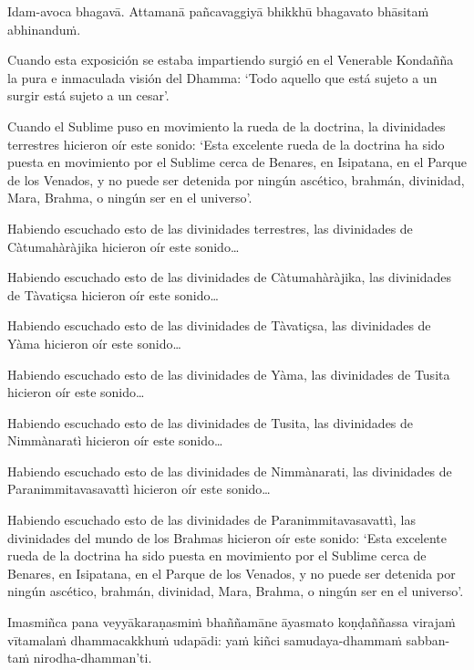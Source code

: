 Idam-avoca bhagavā. Attamanā pañcavaggiyā bhikkhū bhagavato bhāsitaṁ
abhinanduṁ.

\clearpage

\englishText
\markboth{\englishTitle}{\rightmark}

Cuando esta exposición se estaba impartiendo surgió en el Venerable Kondañña la pura e inmaculada visión del Dhamma: ‘Todo aquello que está sujeto a un surgir está sujeto a un cesar’.

Cuando el Sublime puso en movimiento la rueda de la doctrina, la divinidades terrestres hicieron oír este sonido: ‘Esta excelente rueda de la doctrina ha sido puesta en movimiento por el Sublime cerca de Benares, en Isipatana, en el Parque de los Venados, y no puede ser detenida por ningún ascético, brahmán, divinidad, Mara, Brahma, o ningún ser en el universo’.

Habiendo escuchado esto de las divinidades terrestres, las divinidades de Càtumahàràjika hicieron oír este sonido\ldots

Habiendo escuchado esto de las divinidades de Càtumahàràjika, las divinidades de Tàvatiçsa hicieron oír este sonido\ldots

Habiendo escuchado esto de las divinidades de Tàvatiçsa, las divinidades de Yàma hicieron oír este sonido\ldots  

Habiendo escuchado esto de las divinidades de Yàma, las divinidades de Tusita hicieron oír este sonido\ldots

Habiendo escuchado esto de las divinidades de Tusita, las divinidades de Nimmànaratì hicieron oír este sonido\ldots

Habiendo escuchado esto de las divinidades de Nimmànarati, las divinidades de Paranimmitavasavattì hicieron oír este sonido\ldots

Habiendo escuchado esto de las divinidades de Paranimmitavasavattì, las divinidades del mundo de los Brahmas hicieron oír este sonido: ‘Esta excelente rueda de la doctrina ha sido puesta en movimiento por el Sublime cerca de Benares, en Isipatana, en el Parque de los Venados, y no puede ser detenida por ningún ascético, brahmán, divinidad, Mara, Brahma, o ningún ser en el universo’.



\clearpage

\paliText
\markboth{\paliTitle}{\rightmark}

Imasmiñca pana veyyākaraṇasmiṁ bhaññamāne āyasmato koṇḍaññassa virajaṁ
vītamalaṁ dhammacakkhuṁ udapādi: yaṁ kiñci samudaya-dhammaṁ sabban-taṁ
nirodha-dhamman'ti.


